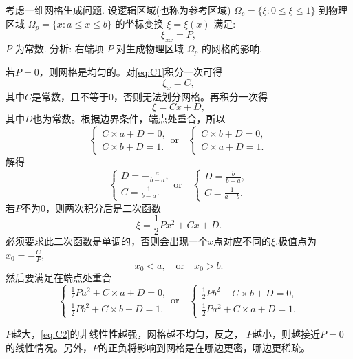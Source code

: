 \documentclass[12pt]{article}
\begin{document}
考虑一维网格生成问题. 设逻辑区域(也称为参考区域) $\Omega_{c}=\{\xi: 0 \leq \xi \leq 1\}$ 到物理区域 $\Omega_{p}=\{x: a \leq x \leq b\}$ 的坐标变换 $\xi=\xi(x)$ 满足:
\begin{equation}
	\xi_{x x}=P,
	\label{eq:C1}
\end{equation}
$  P$ 为常数.
分析: 右端项 $P$ 对生成物理区域 $\Omega_{p}$ 的网格的影响.

若$P=0$，则网格是均匀的。对\cref{eq:C1}积分一次可得
\begin{equation}
	\xi_{x}=C,
\end{equation}
其中$C$是常数，且不等于0，否则无法划分网格。再积分一次得
\begin{equation}
	\xi = Cx+D,
\end{equation}
其中$D$也为常数。根据边界条件，端点处重合，所以
\begin{equation}
	\begin{cases}
		C\times a+D=0, \\
		C\times b+D=1.
	\end{cases}\text{or} \quad
	\begin{cases}
		C\times b+D=0, \\
		C\times a+D=1.
	\end{cases}
\end{equation}
解得
\begin{equation}
	\begin{cases}
		D=-\frac{a}{b-a}, \\
		C=\frac{1}{b-a}.
	\end{cases}\text{or} \quad
	\begin{cases}
		D=\frac{b}{b-a}, \\
		C=\frac{1}{a-b}.
	\end{cases}
\end{equation}
若$P$不为0，则两次积分后是二次函数
\begin{equation}
	\xi = \frac{1}{2} Px^2 + Cx + D.
	\label{eq:C2}
\end{equation}
必须要求此二次函数是单调的，否则会出现一个$x$点对应不同的$\xi$.极值点为$x_0=-\frac{C}{P}$,
\begin{equation}
	x_0<a,\quad \text{or}\quad  x_0>b.
\end{equation}
然后要满足在端点处重合
\begin{equation}
	\begin{cases}
		\frac{1}{2}Pa^2 + C\times a+D=0, \\
		\frac{1}{2}Pb^2 + C\times b+D=1.
	\end{cases}\text{or} \quad
	\begin{cases}
		\frac{1}{2}Pb^2 + C\times b+D=0, \\
		\frac{1}{2}Pa^2 + C\times a+D=1.
	\end{cases}
\end{equation}

$P$越大，\cref{eq:C2}的非线性性越强，网格越不均匀，反之， $P$越小，则越接近$P=0$的线性情况。另外，$P$的正负将影响到网格是在哪边更密，哪边更稀疏。



\nocite{*}


\end{document}
